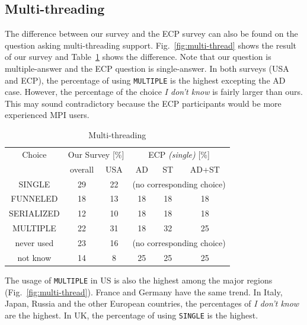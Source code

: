 \documentclass[preprint,5p,times]{elsarticle}
\def\myquote#1{{\it #1}}
\begin{document}
\subsection{Multi-threading}\label{sec:mutil-threading}

The difference between our survey and the ECP survey can also be found on
the question asking multi-threading support. Fig.~\ref{fig:multi-thread}
shows the result of our survey and Table~\ref{tab:multi-thread} shows
the difference. Note that our question is multiple-answer and the ECP
question is single-answer. In both surveys (USA and ECP), the
percentage of using {\tt MULTIPLE} is the highest excepting the AD
case. However, the percentage of the choice \myquote{I don't know}
is fairly larger than ours. This may sound contradictory because the
ECP participants would be more experienced MPI users.

\begin{table}[htb]%
  \begin{center}%
    \caption{Multi-threading}\label{tab:multi-thread}%
    \begin{tabular}{c||c|c||c|c|c}%
      \hline%
      Choice & \multicolumn{2}{c||}{Our Survey [\%]} &
      \multicolumn{3}{c}{ECP {\it(single)} [\%]} \\
      \cline{2-6}%
      & overall & USA & AD & ST & AD+ST \\
      \hline%
      SINGLE & 29 & 22 & \multicolumn{3}{c}{\scriptsize (no corresponding choice)} \\
      FUNNELED & 18 & 13 & 18 & 18 & 18 \\
      SERIALIZED & 12 & 10 & 18 & 18 & 18 \\
      MULTIPLE & 22 & 31 & 18 & 32 & 25 \\
      never used & 23 & 16 & \multicolumn{3}{c}{\scriptsize (no corresponding choice)} \\
      not know & 14 & 8 & 25 & 25 & 25\\
      \hline%
    \end{tabular}%
  \end{center}%
\end{table}%

The usage of {\tt MULTIPLE} in US is also the highest among the major
regions (Fig.~\ref{fig:multi-thread}). France and Germany have the
same trend. In Italy, Japan, Russia and the
other European countries, the percentages of \myquote{I don't know}
are the highest. In UK, the percentage of using {\tt SINGLE} is the
highest.
\end{document}
